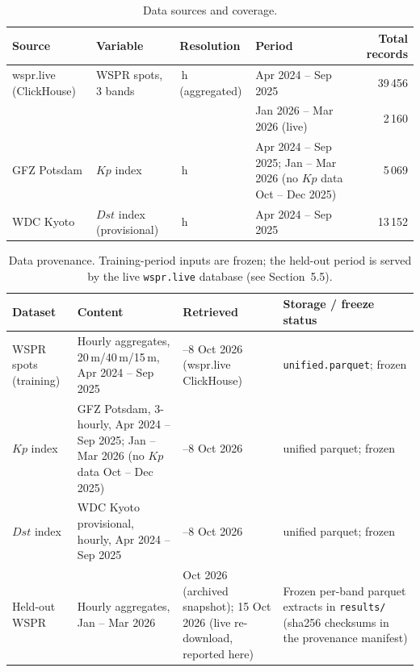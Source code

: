\documentclass{agujournal2019}
\begin{document}
\begin{table}[h]
	\centering
	\caption{Data sources and coverage.\protect\footnotemark{}}
	\label{tab:data}
	\begin{tabularx}{\textwidth}{@{}l >{\raggedright\arraybackslash}X >{\raggedright\arraybackslash}X >{\raggedright\arraybackslash}X r@{}}
		\toprule
		Source                 & Variable                  & Resolution        & Period               & Total records \\
		\midrule
		wspr.live (ClickHouse) & WSPR spots, 3 bands       & 1\,h (aggregated)
		                       & Apr 2024 -- Sep 2025      & 39\,456                                                  \\
		                       &                           &                   & Jan 2026 -- Mar 2026 (live) & 2\,160  \\
		GFZ Potsdam            & $Kp$ index                & 3\,h
		                       & Apr 2024 -- Sep 2025; Jan -- Mar 2026 (no $Kp$ data Oct -- Dec 2025) & 5\,069                                                   \\
		WDC Kyoto & $Dst$ index (provisional) & 1\,h
		& Apr 2024 -- Sep 2025 & 13\,152 \\
		\bottomrule
	\end{tabularx}
\end{table}


\begin{table}[h]
	\centering
	\small
	\setlength{\tabcolsep}{4pt}
	\caption{Data provenance. Training-period inputs are frozen;
		the held-out period is served by the live \texttt{wspr.live}
		database (see Section~5.5).}
	\label{tab:provenance}
	\begin{tabularx}{\textwidth}{@{}l >{\raggedright\arraybackslash}X >{\raggedright\arraybackslash}X >{\raggedright\arraybackslash}X@{}}
		\toprule
		Dataset & Content & Retrieved & Storage / freeze status \\
		\midrule
		WSPR spots (training) & Hourly aggregates, 20\,m/40\,m/15\,m,
		Apr 2024 -- Sep 2025 & 7--8 Oct 2026 (wspr.live ClickHouse) &
		\texttt{unified.parquet}; frozen \\
		$Kp$ index & GFZ Potsdam, 3-hourly,
		Apr 2024 -- Sep 2025; Jan -- Mar 2026 (no $Kp$ data Oct -- Dec 2025) &
		7--8 Oct 2026 & unified parquet; frozen \\
		$Dst$ index & WDC Kyoto provisional, hourly,
		Apr 2024 -- Sep 2025 & 7--8 Oct 2026 & unified parquet; frozen \\
		Held-out WSPR & Hourly aggregates, Jan -- Mar 2026 &
		8 Oct 2026 (archived snapshot); 15 Oct 2026 (live
		re-download, reported here) & Frozen per-band parquet extracts in
		\texttt{results/} (sha256 checksums in the provenance manifest) \\
		\bottomrule
	\end{tabularx}
\end{table}
\end{document}
